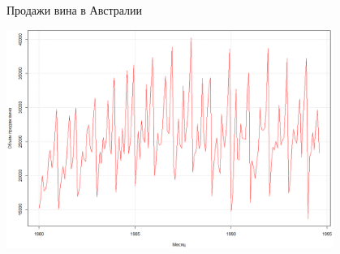 \documentclass[9pt,pdf,utf8,hyperref={unicode},aspectratio=169]{beamer}
\begin{document}
\begin{frame}{Продажи вина в Австралии}
	\begin{center}
		\includegraphics[width=0.8\textwidth]{wine.png}
	\end{center}	
\end{frame}
\end{document}
